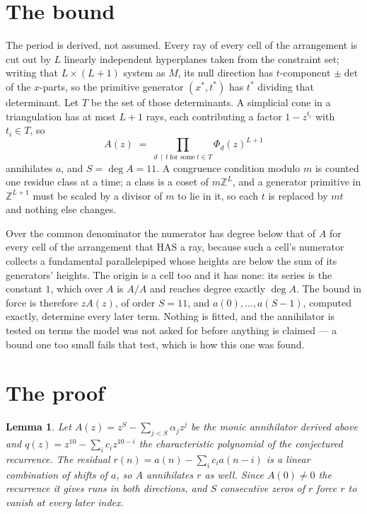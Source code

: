 \documentclass[11pt,a4paper]{article}
\theoremstyle{plain}
\newtheorem{lemma}[theorem]{Lemma}
\theoremstyle{definition}
\begin{document}
\section{The bound}

The period is derived, not assumed. Every ray of every cell of the arrangement is cut out by
$L$ linearly independent hyperplanes taken from the constraint set; writing that $L\times(L+1)$
system as $M$, its null direction has $t$-component $\pm\det$ of the $x$-parts, so the
primitive generator $(x^*,t^*)$ has $t^*$ dividing that determinant. Let $T$ be the set of
those determinants. A simplicial cone in a triangulation has at most $L+1$ rays, each
contributing a factor $1-z^{t_i}$ with $t_i\in T$, so
\[
A(z)\;=\;\prod_{d\,\mid\,t\ \text{for some}\ t\in T}\Phi_d(z)^{L+1}
\]
annihilates $a$, and $S=\deg A=11$. A congruence condition modulo $m$ is counted one residue
class at a time; a class is a coset of $m\mathbb{Z}^L$, and a generator primitive in
$\mathbb{Z}^{L+1}$ must be scaled by a divisor of $m$ to lie in it, so each $t$ is replaced
by $mt$ and nothing else changes.

Over the common denominator the numerator has degree below that of $A$ for every cell of the
arrangement that HAS a ray, because such a cell's numerator collects a fundamental
parallelepiped whose heights are below the sum of its generators' heights. The origin is a cell
too and it has none: its series is the constant $1$, which over $A$ is $A/A$ and reaches degree
exactly $\deg A$. The bound in force is therefore $zA(z)$, of order $S=11$, and
$a(0),\dots,a(S-1)$, computed exactly, determine every later term. Nothing is fitted, and the
annihilator is tested on terms the model was not asked for before anything is claimed --- a
bound one too small fails that test, which is how this one was found.

\section{The proof}

\begin{lemma}\label{lem:crit}
Let $A(z)=z^S-\sum_{j<S}\alpha_jz^{j}$ be the monic annihilator derived above and
$q(z)=z^{10}-\sum_ic_iz^{10-i}$ the characteristic polynomial of the conjectured
recurrence. The residual $r(n)=a(n)-\sum_ic_ia(n-i)$ is a linear combination of shifts of $a$,
so $A$ annihilates $r$ as well. Since $A(0)\ne0$ the recurrence it gives runs in both
directions, and $S$ consecutive zeros of $r$ force $r$ to vanish at every later index.
\end{lemma}
\end{document}

